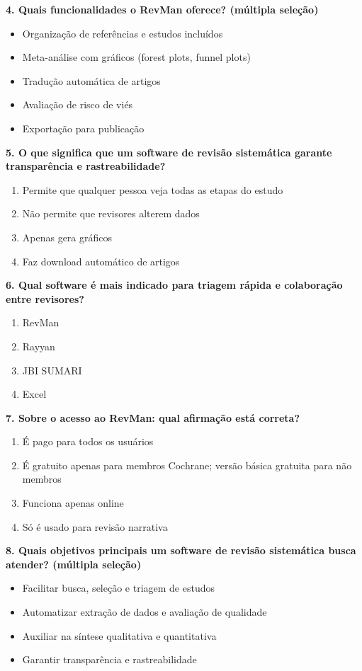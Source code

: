 \documentclass[12pt,a4paper]{article}
\begin{document}
\textbf{4. Quais funcionalidades o RevMan oferece? (múltipla seleção)}
\begin{itemize}
    \item Organização de referências e estudos incluídos
    \item Meta-análise com gráficos (forest plots, funnel plots)
    \item Tradução automática de artigos
    \item Avaliação de risco de viés
    \item Exportação para publicação
\end{itemize}

\textbf{5. O que significa que um software de revisão sistemática garante transparência e rastreabilidade?}
\begin{enumerate}[label=\alph*)]
    \item Permite que qualquer pessoa veja todas as etapas do estudo
    \item Não permite que revisores alterem dados
    \item Apenas gera gráficos
    \item Faz download automático de artigos
\end{enumerate}

\textbf{6. Qual software é mais indicado para triagem rápida e colaboração entre revisores?}
\begin{enumerate}[label=\alph*)]
    \item RevMan
    \item Rayyan
    \item JBI SUMARI
    \item Excel
\end{enumerate}

\textbf{7. Sobre o acesso ao RevMan: qual afirmação está correta?}
\begin{enumerate}[label=\alph*)]
    \item É pago para todos os usuários
    \item É gratuito apenas para membros Cochrane; versão básica gratuita para não membros
    \item Funciona apenas online
    \item Só é usado para revisão narrativa
\end{enumerate}

\textbf{8. Quais objetivos principais um software de revisão sistemática busca atender? (múltipla seleção)}
\begin{itemize}
    \item Facilitar busca, seleção e triagem de estudos
    \item Automatizar extração de dados e avaliação de qualidade
    \item Auxiliar na síntese qualitativa e quantitativa
    \item Garantir transparência e rastreabilidade
\end{itemize}
\end{document}
